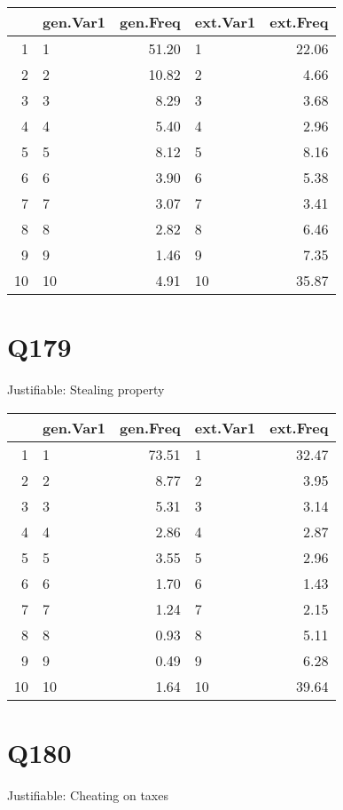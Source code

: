 \documentclass{amsart}
\begin{document}
\begin{table}[ht]
\centering
\begin{tabular}{rlrlr}
  \hline
 & gen.Var1 & gen.Freq & ext.Var1 & ext.Freq \\ 
  \hline
1 & 1 & 51.20 & 1 & 22.06 \\ 
  2 & 2 & 10.82 & 2 & 4.66 \\ 
  3 & 3 & 8.29 & 3 & 3.68 \\ 
  4 & 4 & 5.40 & 4 & 2.96 \\ 
  5 & 5 & 8.12 & 5 & 8.16 \\ 
  6 & 6 & 3.90 & 6 & 5.38 \\ 
  7 & 7 & 3.07 & 7 & 3.41 \\ 
  8 & 8 & 2.82 & 8 & 6.46 \\ 
  9 & 9 & 1.46 & 9 & 7.35 \\ 
  10 & 10 & 4.91 & 10 & 35.87 \\ 
   \hline
\end{tabular}
\end{table}

\section{Q179}
Justifiable: Stealing property
\begin{table}[ht]
\centering
\begin{tabular}{rlrlr}
  \hline
 & gen.Var1 & gen.Freq & ext.Var1 & ext.Freq \\ 
  \hline
1 & 1 & 73.51 & 1 & 32.47 \\ 
  2 & 2 & 8.77 & 2 & 3.95 \\ 
  3 & 3 & 5.31 & 3 & 3.14 \\ 
  4 & 4 & 2.86 & 4 & 2.87 \\ 
  5 & 5 & 3.55 & 5 & 2.96 \\ 
  6 & 6 & 1.70 & 6 & 1.43 \\ 
  7 & 7 & 1.24 & 7 & 2.15 \\ 
  8 & 8 & 0.93 & 8 & 5.11 \\ 
  9 & 9 & 0.49 & 9 & 6.28 \\ 
  10 & 10 & 1.64 & 10 & 39.64 \\ 
   \hline
\end{tabular}
\end{table}

\section{Q180}
Justifiable: Cheating on taxes
\end{document}
